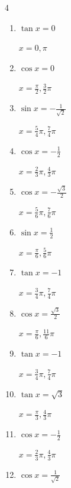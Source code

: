 \begin{multicols}{4}
\begin{enumerate}
  \item $\displaystyle \tan{x}  = 0$

        $\displaystyle x = 0 , \pi$

  \item $\displaystyle \cos{x}  = 0$

        $\displaystyle x = \frac{\pi}{2} , \frac{3}{2}\pi$

  \item $\displaystyle \sin{x}  = -\frac{1}{\sqrt{2}}$

        $\displaystyle x = \frac{5}{4}\pi , \frac{7}{4}\pi$

  \item $\displaystyle \cos{x}  = -\frac{1}{2}$

        $\displaystyle x = \frac{2}{3}\pi , \frac{4}{3}\pi$

\columnbreak %

  \item $\displaystyle \cos{x}  = -\frac{\sqrt{3}}{2}$

        $\displaystyle x = \frac{5}{6}\pi , \frac{7}{6}\pi$

  \item $\displaystyle \sin{x}  = \frac{1}{2}$

        $\displaystyle x = \frac{\pi}{6} , \frac{5}{6}\pi$

  \item $\displaystyle \tan{x}  = -1$

        $\displaystyle x = \frac{3}{4}\pi , \frac{7}{4}\pi$

  \item $\displaystyle \cos{x}  = \frac{\sqrt{3}}{2}$

        $\displaystyle x = \frac{\pi}{6} , \frac{11}{6}\pi$

  \item $\displaystyle \tan{x}  = -1$

        $\displaystyle x = \frac{3}{4}\pi , \frac{7}{4}\pi$

  \item $\displaystyle \tan{x}  = \sqrt{3}$

        $\displaystyle x = \frac{\pi}{3} , \frac{4}{3}\pi$

  \item $\displaystyle \cos{x}  = -\frac{1}{2}$

        $\displaystyle x = \frac{2}{3}\pi , \frac{4}{3}\pi$

  \item $\displaystyle \cos{x}  = \frac{1}{\sqrt{2}}$


\end{enumerate}
\end{multicols}
